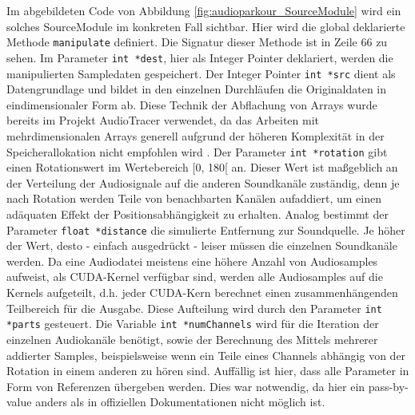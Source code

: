 Im abgebildeten Code von Abbildung \ref{fig:audioparkour_SourceModule} wird ein solches SourceModule im konkreten Fall sichtbar. Hier wird die global deklarierte Methode \texttt{manipulate} definiert. Die Signatur dieser Methode ist in Zeile 66 zu sehen. Im Parameter \texttt{int *dest}, hier als Integer Pointer deklariert, werden die manipulierten Sampledaten gespeichert. Der Integer Pointer \texttt{int *src} dient als Datengrundlage und bildet in den einzelnen Durchläufen die Originaldaten in eindimensionaler Form ab. Diese Technik der Abflachung von Arrays wurde bereits im Projekt AudioTracer verwendet, da das Arbeiten mit mehrdimensionalen Arrays generell aufgrund der höheren Komplexität in der Speicherallokation nicht empfohlen wird \cite{nvidia_docs_best_practice}. Der Parameter \texttt{int *rotation} gibt einen Rotationswert im Wertebereich [0, 180[ an. Dieser Wert ist maßgeblich an der Verteilung der Audiosignale auf die anderen Soundkanäle zuständig, denn je nach Rotation werden Teile von benachbarten Kanälen aufaddiert, um einen adäquaten Effekt der Positionsabhängigkeit zu erhalten. Analog bestimmt der Parameter \texttt{float *distance} die simulierte Entfernung zur Soundquelle. Je höher der Wert, desto - einfach ausgedrückt - leiser müssen die einzelnen Soundkanäle werden. Da eine Audiodatei meistens eine höhere Anzahl von Audiosamples aufweist, als CUDA-Kernel verfügbar sind, werden alle Audiosamples auf die Kernels aufgeteilt, d.h. jeder CUDA-Kern berechnet einen zusammenhängenden Teilbereich für die Ausgabe. Diese Aufteilung wird durch den Parameter \texttt{int *parts} gesteuert. Die Variable \texttt{int *numChannels} wird für die Iteration der einzelnen Audiokanäle benötigt, sowie der Berechnung des Mittels mehrerer addierter Samples, beispielsweise wenn ein Teile eines Channels abhängig von der Rotation in einem anderen zu hören sind.
Auffällig ist hier, dass alle Parameter in Form von Referenzen übergeben werden. Dies war notwendig, da hier ein pass-by-value anders als in offiziellen Dokumentationen \cite{pycuda_docs} nicht möglich ist.

